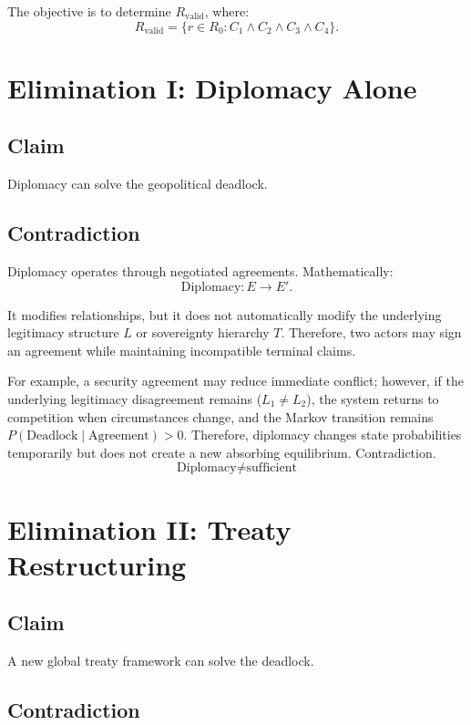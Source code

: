 \documentclass[11pt,openany]{book}
\theoremstyle{plain}
\theoremstyle{definition}
\begin{document}
The objective is to determine \(R_{\text{valid}}\), where:
\[
R_{\text{valid}} = \{r \in R_0 : C_1 \land C_2 \land C_3 \land C_4\}.
\]

\section*{Elimination I: Diplomacy Alone}

\subsection*{Claim}

Diplomacy can solve the geopolitical deadlock.

\subsection*{Contradiction}

Diplomacy operates through negotiated agreements. Mathematically:
\[
\text{Diplomacy}: E \longrightarrow E'.
\]

It modifies relationships, but it does not automatically modify the underlying legitimacy structure \(L\) or sovereignty hierarchy \(T\). Therefore, two actors may sign an agreement while maintaining incompatible terminal claims. 

For example, a security agreement may reduce immediate conflict; however, if the underlying legitimacy disagreement remains (\(L_1 \neq L_2\)), the system returns to competition when circumstances change, and the Markov transition remains \(P(\text{Deadlock} \mid \text{Agreement}) > 0\). Therefore, diplomacy changes state probabilities temporarily but does not create a new absorbing equilibrium. Contradiction.
\[
\boxed{
\text{Diplomacy} \neq \text{sufficient}
}
\]

\section*{Elimination II: Treaty Restructuring}

\subsection*{Claim}

A new global treaty framework can solve the deadlock.

\subsection*{Contradiction}
\end{document}
